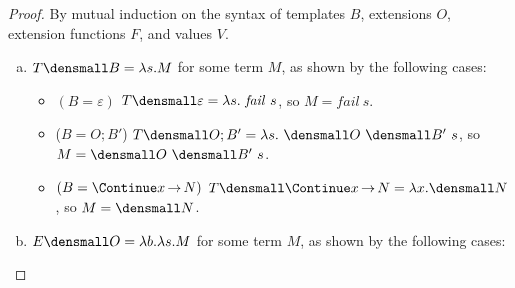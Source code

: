 \begin{proof}

  By mutual induction on the syntax of templates $B$, extensions $O$, extension functions $F$, and values $V$.
  \begin{enumerate}[(a)]
  \item $T\den{B} = \lambda s. M$ for some term $M$, as shown by the following cases:
    \begin{itemize}
    \item $(B = \varepsilon)$
      $T\den{\varepsilon} = \lambda s. ~\mathit{fail} ~s$, so $M=\mathit{fail} ~s$.
    \item ($B = O; B'$)
      $T\den{O; B'} = \lambda s. ~\den{O} ~\den{B'} ~s$, so $M = \den{O} ~\den{B'} ~s$.
    \item $(B = \Continue x {\,\to\,} N)$
      $T\den{\Continue x {\,\to\,} N} = \lambda x. \den{N}$, so $M = \den{N}$.
    \end{itemize}
  \item $E\den{O} = \lambda b. \lambda s. M$ for some term $M$, as shown by the following cases: 

\end{enumerate}
\end{proof}
